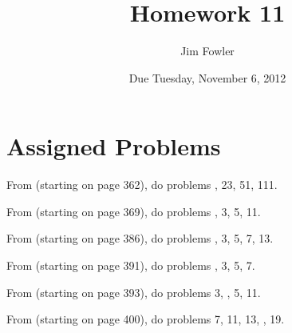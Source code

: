 \documentclass[12pt]{handout}
\title{Homework 11}
\date{Due Tuesday, November  6, 2012}
\author{Jim Fowler}
\begin{document}
\maketitle











\section*{Assigned Problems}

From  (starting on page 362),
do problems , 23, 51, 111.
\vspace{1ex}

From  (starting on page 369),
do problems , 3, 5, 11.
\vspace{1ex}

From  (starting on page 386),
do problems , 3, 5, 7, 13.
\vspace{1ex}

From  (starting on page 391),
do problems , 3, 5, 7.
\vspace{1ex}

From  (starting on page 393),
do problems 3, , 5, 11.
\vspace{1ex}

From  (starting on page 400),
do problems 7, 11, 13, , 19.
\vspace{1ex}
\end{document}
